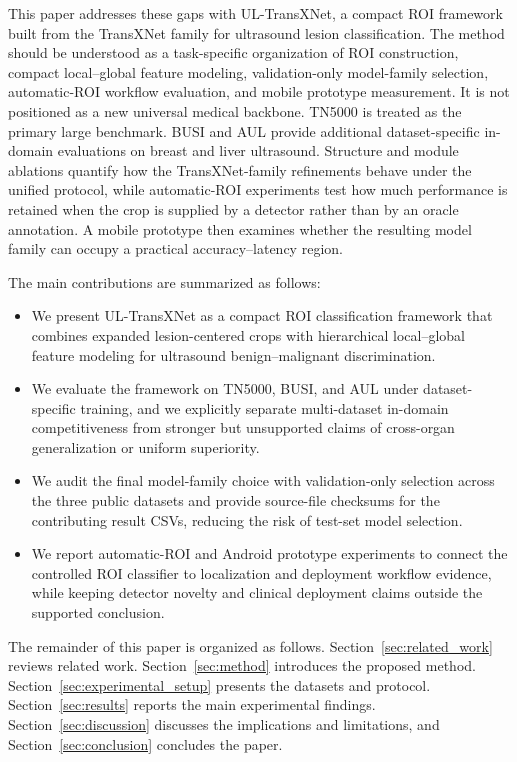 This paper addresses these gaps with UL-TransXNet, a compact ROI framework built from the TransXNet family for ultrasound lesion classification. The method should be understood as a task-specific organization of ROI construction, compact local--global feature modeling, validation-only model-family selection, automatic-ROI workflow evaluation, and mobile prototype measurement. It is not positioned as a new universal medical backbone. TN5000 is treated as the primary large benchmark. BUSI and AUL provide additional dataset-specific in-domain evaluations on breast and liver ultrasound. Structure and module ablations quantify how the TransXNet-family refinements behave under the unified protocol, while automatic-ROI experiments test how much performance is retained when the crop is supplied by a detector rather than by an oracle annotation. A mobile prototype then examines whether the resulting model family can occupy a practical accuracy--latency region.

The main contributions are summarized as follows:
\begin{itemize}[leftmargin=1.5em]
    \item We present UL-TransXNet as a compact ROI classification framework that combines expanded lesion-centered crops with hierarchical local--global feature modeling for ultrasound benign--malignant discrimination.
    \item We evaluate the framework on TN5000, BUSI, and AUL under dataset-specific training, and we explicitly separate multi-dataset in-domain competitiveness from stronger but unsupported claims of cross-organ generalization or uniform superiority.
    \item We audit the final model-family choice with validation-only selection across the three public datasets and provide source-file checksums for the contributing result CSVs, reducing the risk of test-set model selection.
    \item We report automatic-ROI and Android prototype experiments to connect the controlled ROI classifier to localization and deployment workflow evidence, while keeping detector novelty and clinical deployment claims outside the supported conclusion.
\end{itemize}

The remainder of this paper is organized as follows. Section~\ref{sec:related_work} reviews related work. Section~\ref{sec:method} introduces the proposed method. Section~\ref{sec:experimental_setup} presents the datasets and protocol. Section~\ref{sec:results} reports the main experimental findings. Section~\ref{sec:discussion} discusses the implications and limitations, and Section~\ref{sec:conclusion} concludes the paper.

